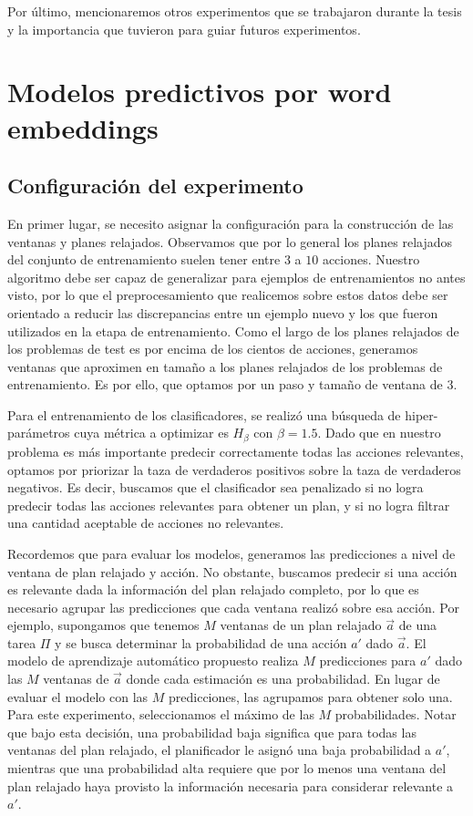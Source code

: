 Por último, mencionaremos otros experimentos que se trabajaron durante la tesis
y la importancia que tuvieron para guiar futuros experimentos.

\section{Modelos predictivos por word embeddings}
\label{exp:ad-hoc}

\subsection{Configuración del experimento}

En primer lugar, se necesito asignar la configuración para la construcción de
las ventanas y planes relajados.  Observamos que por lo general los planes
relajados del conjunto de entrenamiento suelen tener entre $3$ a $10$ acciones.
Nuestro algoritmo debe ser capaz de generalizar para ejemplos de entrenamientos
no antes visto, por lo que el preprocesamiento que realicemos sobre estos datos
debe ser orientado a reducir las discrepancias entre un ejemplo nuevo y los que
fueron utilizados en la etapa de entrenamiento. Como el largo de los planes
relajados de los problemas de test es por encima de los cientos de acciones,
generamos ventanas que aproximen en tamaño a los planes relajados de los
problemas de entrenamiento. Es por ello, que optamos por un paso y tamaño de
ventana de $3$.

Para el entrenamiento de los clasificadores, se realizó una búsqueda de
hiper-parámetros cuya métrica a optimizar es $H_{\beta}$ con $\beta = 1.5$. Dado
que en nuestro problema es más importante predecir correctamente todas las
acciones relevantes, optamos por priorizar la taza de verdaderos positivos sobre
la taza de verdaderos negativos. Es decir, buscamos que el clasificador sea
penalizado si no logra predecir todas las acciones relevantes para obtener un
plan, y si no logra filtrar una cantidad aceptable de acciones no relevantes.

Recordemos que para evaluar los modelos, generamos las predicciones a nivel de
ventana de plan relajado y acción. No obstante, buscamos predecir si una acción
es relevante dada la información del plan relajado completo, por lo que es
necesario agrupar las predicciones que cada ventana realizó sobre esa acción.
Por ejemplo, supongamos que tenemos $M$ ventanas de un plan relajado $\vec{a}$
de una tarea $\Pi$ y se busca determinar la probabilidad de una acción $a'$ dado
$\vec{a}$. El modelo de aprendizaje automático propuesto realiza $M$
predicciones para $a'$ dado las $M$ ventanas de $\vec{a}$ donde cada estimación
es una probabilidad. En lugar de evaluar el modelo con las $M$ predicciones, las
agrupamos para obtener solo una. Para este experimento, seleccionamos el máximo
de las $M$ probabilidades. Notar que bajo esta decisión, una probabilidad baja
significa que para todas las ventanas del plan relajado, el planificador le
asignó una baja probabilidad a $a'$, mientras que una probabilidad alta requiere
que por lo menos una ventana del plan relajado haya provisto la información
necesaria para considerar relevante a $a'$.


